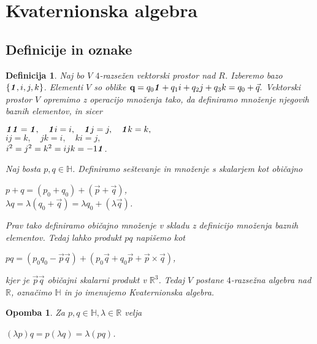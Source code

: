 \documentclass[a4paper,12pt]{article}
\def\R{\mathbb{R}} %
\def\H{\mathbb{H}} %
\def\1{\textbf{\emph{1}}}
\newtheorem{opomba}{Opomba}
\newtheorem{definicija}{Definicija}
\begin{document}
\section{Kvaternionska algebra}
\subsection{Definicije in oznake}

\begin{definicija}
Naj bo $V$ $4$-razsežen vektorski prostor nad $R$. Izberemo bazo $\left\{\1, i, j, k\right\}$. Elementi $V$ so oblike $\textbf{q} = q_{0}\1 + q_{1}i + q_{2}j + q_{3}k = q_{0} + \vec{q}.$
Vektorski prostor $V$ opremimo z operacijo množenja tako, da definiramo množenje njegovih baznih elementov, in sicer
\begin{center}
   $\1 \1 = \1, \hspace{1em}  \1i = i, \hspace{1em} \1j = j, \hspace{1em} \1k = k,$\\
   $ij = k, \hspace{1em} jk = i, \hspace{1em} ki = j,$\\
   $i^2 = j^2 = k^2 = ijk = -1\1$.
\end{center}
Naj bosta $p, q \in \H$. Definiramo seštevanje in množenje s skalarjem kot običajno
\begin{center}
   $p + q = \left( p_{0} + q_{0} \right) + \left( \vec{p} + \vec{q} \right)$, \\
   $ \lambda q = \lambda \left(q_{0} + \vec{q} \right) = \lambda q_{0} + \left(\lambda \vec{q}\right) $.
\end{center}
Prav tako definiramo običajno množenje v skladu z definicijo množenja baznih elementov. Tedaj lahko
produkt $pq$ napišemo kot
\begin{center}
   $pq = (p_{0} q_{0} - \vec{p} \vec{q}) + (p_{0}\vec{q} + q_{0}\vec{p} + \vec{p}\times\vec{q})$,
\end{center}
kjer je $\vec{p}\vec{q}$ običajni skalarni produkt v $\R^3$.
Tedaj $V$ postane $4$-razsežna algebra nad $\R$, označimo $\H$ in jo imenujemo \emph{Kvaternionska algebra}.
\end{definicija}

\begin{opomba}
Za $p,q \in \H, \lambda \in \R$ velja
\begin{center}
      $(\lambda p)q = p(\lambda q) = \lambda (pq)$.
\end{center}
\end{opomba}
\end{document}

